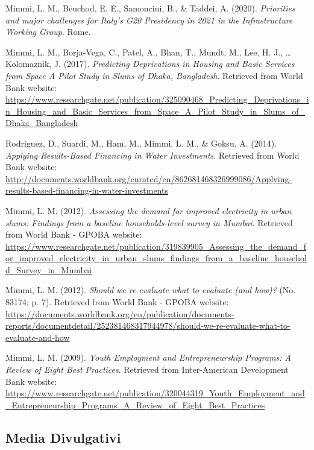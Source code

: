\documentclass[11pt,a4paper,]{awesome-cv}
\begin{document}
\leavevmode{}%
Mimmi, L. M., Beuchod, E. E., Samoncini, B., \& Taddei, A. (2020).
\emph{Priorities and major challenges for Italy's G20 Presidency in 2021
in the Infrastructure Working Group}. Rome.

\leavevmode{}%
Mimmi, L. M., Borja-Vega, C., Patel, A., Bhan, T., Mundt, M., Lee, H.
J., \ldots{} Kolomaznik, J. (2017). \emph{Predicting Deprivations in
Housing and Basic Services from Space A Pilot Study in Slums of Dhaka,
Bangladesh}. Retrieved from World Bank website:
\url{https://www.researchgate.net/publication/325090468_Predicting_Deprivations_in_Housing_and_Basic_Services_from_Space_A_Pilot_Study_in_Slums_of_Dhaka_Bangladesh}

\leavevmode{}%
Rodriguez, D., Suardi, M., Ham, M., Mimmi, L. M., \& Goksu, A. (2014).
\emph{Applying Results-Based Financing in Water Investments}. Retrieved
from World Bank website:
\url{http://documents.worldbank.org/curated/en/862681468326999086/Applying-results-based-financing-in-water-investments}

\leavevmode{}%
Mimmi, L. M. (2012). \emph{Assessing the demand for improved electricity
in urban slums: Findings from a baseline households-level survey in
Mumbai}. Retrieved from World Bank - GPOBA website:
\url{https://www.researchgate.net/publication/319839905_Assessing_the_demand_for_improved_electricity_in_urban_slums_findings_from_a_baseline_household_Survey_in_Mumbai}

\leavevmode{}%
Mimmi, L. M. (2012). \emph{Should we re-evaluate what to evaluate (and
how)?} (No. 83174; p. 7). Retrieved from World Bank - GPOBA website:
\url{https://documents.worldbank.org/en/publication/documents-reports/documentdetail/252381468317944978/should-we-re-evaluate-what-to-evaluate-and-how}

\leavevmode{}%
Mimmi, L. M. (2009). \emph{Youth Employment and Entrepreneurship
Programs: A Review of Eight Best Practices}. Retrieved from
Inter-American Development Bank website:
\url{https://www.researchgate.net/publication/320044319_Youth_Employment_and_Entrepreneurship_Programs_A_Review_of_Eight_Best_Practices}

\bigskip

\hypertarget{media-divulgativi}{%
\subsection{\texorpdfstring{ Media
Divulgativi}{ Media Divulgativi}}\label{media-divulgativi}}
\end{document}
